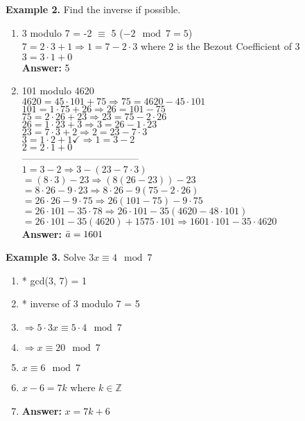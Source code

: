 \documentclass [12pt]{article}
\begin{document}
\pagebreak
\noindent\textbf{Example 2.} Find the inverse if possible.
\begin{enumerate}[\quad(a)]
    \item 3 modulo 7 = -2 $\equiv$ 5 \quad ($-2\mod7=5$)\\
    \quad $7=2\cdot3+1\Rightarrow1=7-2\cdot3$ where 2 is the Bezout Coefficient of 3\\
    \quad $3 = 3\cdot1+0$ \\
    \quad\textbf{Answer:} 5
    \item 101 modulo 4620\\
    \quad $4620=45\cdot101+75 \Rightarrow 75=4620-45\cdot101$\\
    \quad $101 = 1\cdot75+26\Rightarrow26=101-75$\\
    \quad $75=2\cdot26+23\Rightarrow23=75-2\cdot26$\\
    \quad $26=1\cdot23+3\Rightarrow3=26-1\cdot23$\\
    \quad $23=7\cdot3+2\Rightarrow2=23-7\cdot3$\\
    \quad $3=1\cdot2+1$\quad$\checkmark$\quad$\Rightarrow1=3-2$\\
    \quad $2=2\cdot1+0$\\
    ------------------------------------\\
    \quad $1=3-2 \Rightarrow 3-(23-7\cdot3)$\\
    \quad $=(8\cdot3)-23\Rightarrow(8(26-23))-23$\\
    \quad $=8\cdot26-9\cdot23\Rightarrow8\cdot26-9(75-2\cdot26)$\\
    \quad $=26\cdot26-9\cdot75\Rightarrow26(101-75)-9\cdot75$\\
    \quad $=26\cdot101-35\cdot78\Rightarrow26\cdot101-35(4620-48\cdot101)$\\
    \quad $=26\cdot101-35(4620)+1575\cdot101\Rightarrow1601\cdot101-35\cdot4620$\\
    \quad \textbf{Answer:} $\Bar{a} = 1601$
\end{enumerate}
\vspace{0.2in}
\noindent\textbf{Example 3.} Solve $3x\equiv4\mod7$
\begin{enumerate}[\quad]
    \item * gcd(3, 7) = 1 \quad\checkmark
    \item * inverse of 3 modulo 7 = 5
    \item $\Rightarrow5\cdot 3x\equiv5\cdot4\mod7$
    \item $\Rightarrow x \equiv 20\mod 7$
    \item $x\equiv6\mod7$
    \item $x-6=7k$ where $k\in\mathbb{Z}$
    \item \textbf{Answer:} $x=7k+6$
\end{enumerate}
\end{document}
